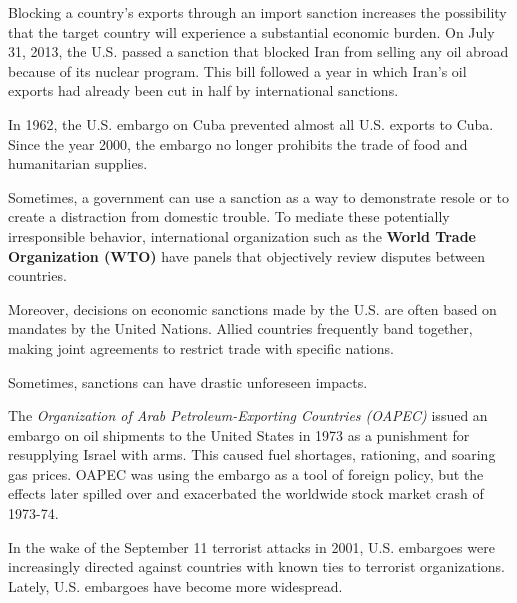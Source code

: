 \documentclass{article}
\begin{document}
      \begin{example}
        Blocking a country's exports through an import sanction increases the possibility that the target country will experience a substantial economic burden. On July 31, 2013, the U.S. passed a sanction that blocked Iran from selling any oil abroad because of its nuclear program. This bill followed a year in which Iran's oil exports had already been cut in half by international sanctions. 
      \end{example}

      \begin{example}
        In 1962, the U.S. embargo on Cuba prevented almost all U.S. exports to Cuba. Since the year 2000, the embargo no longer prohibits the trade of food and humanitarian supplies. 
      \end{example}

      \begin{definition}[WTO]
        Sometimes, a government can use a sanction as a way to demonstrate resole or to create a distraction from domestic trouble. To mediate these potentially irresponsible behavior, international organization such as the \textbf{World Trade Organization (WTO)} have panels that objectively review disputes between countries. 

        Moreover, decisions on economic sanctions made by the U.S. are often based on mandates by the United Nations. Allied countries frequently band together, making joint agreements to restrict trade with specific nations. 
      \end{definition}

      Sometimes, sanctions can have drastic unforeseen impacts. 

      \begin{example}
        The \textit{Organization of Arab Petroleum-Exporting Countries (OAPEC)} issued an embargo on oil shipments to the United States in 1973 as a punishment for resupplying Israel with arms. This caused fuel shortages, rationing, and soaring gas prices. OAPEC was using the embargo as a tool of foreign policy, but the effects later spilled over and exacerbated the worldwide stock market crash of 1973-74. 
      \end{example}

      \begin{example}
        In the wake of the September 11 terrorist attacks in 2001, U.S. embargoes were increasingly directed against countries with known ties to terrorist organizations. Lately, U.S. embargoes have become more widespread. 
      \end{example}
\end{document}
